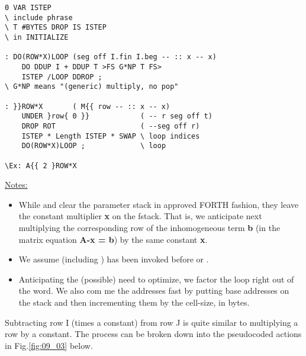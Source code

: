 \begin{verbatim}
0 VAR ISTEP
\ include phrase
\ T #BYTES DROP IS ISTEP
\ in INITIALIZE

: DO(ROW*X)LOOP (seg off I.fin I.beg -- :: x -- x)
    DO DDUP I + DDUP T >FS G*NP T FS>
    ISTEP /LOOP DDROP ;
\ G*NP means "(generic) multiply, no pop"

: }}ROW*X       ( M{{ row -- :: x -- x)
    UNDER }row{ 0 }}            ( -- r seg off t)
    DROP ROT                    ( --seg off r)
    ISTEP * Length ISTEP * SWAP \ loop indices
    DO(ROW*X)LOOP ;             \ loop

\Ex: A{{ 2 }ROW*X 
\end{verbatim}
\underline{Notes:}
\begin{itemize}
    \item  While  and  clear the parameter stack in approved FORTH fashion, they leave the constant
        multiplier \textbf{x} on the fstack. That is, we anticipate next multiplying the corresponding row of the inhomogeneous term \textbf{b} (in
        the matrix equation \textbf{A-x = b}) by the same constant \textbf{x}.
    \item We assume  (including ) has been
        invoked before  or .
  \item Anticipating the (possible) need to optimize, we factor the loop
right out of the word. We also com me the addresses fast by
putting base addresses on the stack and then incrementing
them by the cell-size, in bytes.
\end{itemize}


Subtracting row I (times a constant) from row J is quite similar to
multiplying a row by a constant. The process can be broken down
into the pseudocoded actions in Fig.\ref{fig:09_03} below.

